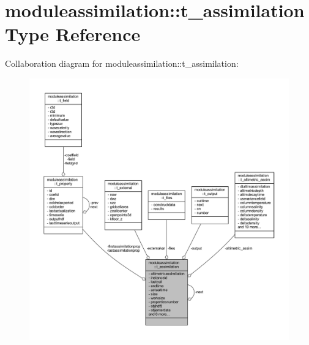 \hypertarget{structmoduleassimilation_1_1t__assimilation}{}\section{moduleassimilation\+:\+:t\+\_\+assimilation Type Reference}
\label{structmoduleassimilation_1_1t__assimilation}


Collaboration diagram for moduleassimilation\+:\+:t\+\_\+assimilation\+:\nopagebreak
\begin{figure}[H]
\begin{center}
\leavevmode
\includegraphics[width=350pt]{structmoduleassimilation_1_1t__assimilation__coll__graph}
\end{center}
\end{figure}
